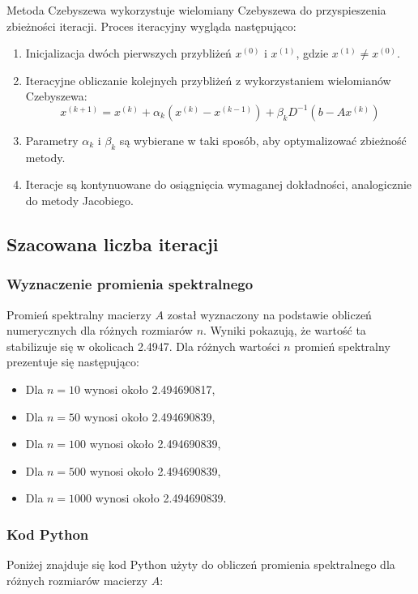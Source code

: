 \documentclass{article}
\begin{document}
Metoda Czebyszewa wykorzystuje wielomiany Czebyszewa do przyspieszenia zbieżności iteracji. Proces iteracyjny wygląda następująco:
\begin{enumerate}
  \item Inicjalizacja dwóch pierwszych przybliżeń $x^{(0)}$ i $x^{(1)}$, gdzie $x^{(1)} \neq x^{(0)}$.
  \item Iteracyjne obliczanie kolejnych przybliżeń z wykorzystaniem wielomianów Czebyszewa:
  \[
  x^{(k+1)} = x^{(k)} + \alpha_k (x^{(k)} - x^{(k-1)}) + \beta_k D^{-1}(b - Ax^{(k)})
  \]
  \item Parametry $\alpha_k$ i $\beta_k$ są wybierane w taki sposób, aby optymalizować zbieżność metody.
  \item Iteracje są kontynuowane do osiągnięcia wymaganej dokładności, analogicznie do metody Jacobiego.
\end{enumerate}

\subsection*{Szacowana liczba iteracji}

\subsubsection*{Wyznaczenie promienia spektralnego}
Promień spektralny macierzy \( A \) został wyznaczony na podstawie obliczeń numerycznych dla różnych rozmiarów \( n \). Wyniki pokazują, że wartość ta stabilizuje się w okolicach 2.4947. Dla różnych wartości \( n \) promień spektralny prezentuje się następująco:
\begin{itemize}
    \item Dla \( n = 10 \) wynosi około 2.494690817,
    \item Dla \( n = 50 \) wynosi około 2.494690839,
    \item Dla \( n = 100 \) wynosi około 2.494690839,
    \item Dla \( n = 500 \) wynosi około 2.494690839,
    \item Dla \( n = 1000 \) wynosi około 2.494690839.
\end{itemize}
\subsubsection*{Kod Python}
Poniżej znajduje się kod Python użyty do obliczeń promienia spektralnego dla różnych rozmiarów macierzy \( A \):
\end{document}

